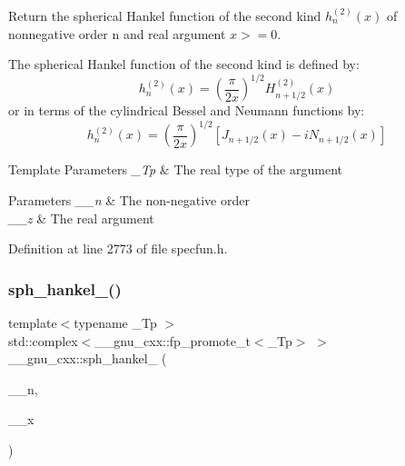 Return the spherical Hankel function of the second kind $ h^{(2)}_n(x)$ of nonnegative order {\ttfamily n} and real argument $ x >= 0 $.

The spherical Hankel function of the second kind is defined by\+: \[ h^{(2)}_n(x) = \left(\frac{\pi}{2x} \right) ^{1/2} H^{(2)}_{n+1/2}(x) \] or in terms of the cylindrical Bessel and Neumann functions by\+: \[ h^{(2)}_n(x) = \left(\frac{\pi}{2x} \right) ^{1/2} \left[ J_{n+1/2}(x) - iN_{n+1/2}(x) \right] \]


\begin{DoxyTemplParams}{Template Parameters}
{\em \+\_\+\+Tp} & The real type of the argument \\
\hline
\end{DoxyTemplParams}

\begin{DoxyParams}{Parameters}
{\em \+\_\+\+\_\+n} & The non-\/negative order \\
\hline
{\em \+\_\+\+\_\+z} & The real argument \\
\hline
\end{DoxyParams}


Definition at line 2773 of file specfun.\+h.

\mbox{\label{group__mathsf__gnu_ga0e7d9b5a93ab1d1040040f0ef44590de}} 
\subsubsection{\texorpdfstring{sph\+\_\+hankel\+\_()}{sph\_hankel\_2()}\hspace{0.1cm}{\footnotesize\ttfamily [2/2]}}
{\footnotesize\ttfamily template$<$typename \+\_\+\+Tp $>$ \\
std\+::complex$<$\+\_\+\+\_\+gnu\+\_\+cxx\+::fp\+\_\+promote\+\_\+t$<$\+\_\+\+Tp$>$ $>$ \+\_\+\+\_\+gnu\+\_\+cxx\+::sph\+\_\+hankel\+\_ (\begin{DoxyParamCaption}\item[{unsigned int}]{\+\_\+\+\_\+n,  }\item[{std\+::complex$<$ \+\_\+\+Tp $>$}]{\+\_\+\+\_\+x }\end{DoxyParamCaption})\hspace{0.3cm}{\ttfamily [inline]}}

